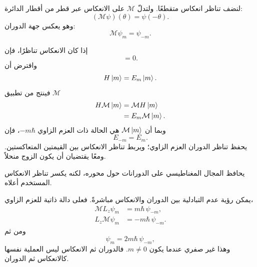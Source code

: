 لنضف تناظر انعكاس متقطعًا. ولتدلّ \(\mathcal M\) على الانعكاس عبر قطر من أقطار الدائرة:
\begin{equation}
(\mathcal M\psi)(\theta)=\psi(-\theta).
\end{equation}
وهو يعكس جهة الدوران:
\begin{equation}
\mathcal M\psi_m=\psi_{-m}.
\end{equation}

إذا كان الانعكاس تناظرًا، فإن
\begin{equation}
[\mathcal M,H]=0.
\end{equation}
وافترض أن
\begin{equation}
H\left\lvert m\right\rangle=E_m\left\lvert m\right\rangle.
\end{equation}
فينتج من تطبيق \(\mathcal M\)
\begin{align}
H\mathcal M\left\lvert m\right\rangle
&=\mathcal M H\left\lvert m\right\rangle\\
&=E_m\mathcal M\left\lvert m\right\rangle.
\end{align}
وبما أن \(\mathcal M\left\lvert m\right\rangle\) هي الحالة ذات العزم الزاوي \(-m\hbar\)، فإن
\begin{equation}
E_{-m}=E_m.
\end{equation}
يحفظ تناظر الدوران العزم الزاوي؛ ويربط تناظر الانعكاس بين القيمتين المتعاكستين. ومعًا يقتضيان أن يكون الزوج منحلاً.

\begin{classroomqa}
\end{classroomqa}

يحافظ المجال المغناطيسي على الدورانات حول محوره، لكنه يكسر تناظر الانعكاس المستخدم أعلاه.

\begin{classroomqa}
\end{classroomqa}

يمكن رؤية عدم التبادلية بين الدوران والانعكاس مباشرةً. فعلى دالة ذاتية للعزم الزاوي،
\begin{align}
\mathcal M L_z\psi_m
&=m\hbar\,\psi_{-m},\\
L_z\mathcal M\psi_m
&=-m\hbar\,\psi_{-m}.
\end{align}
ومن ثم
\begin{equation}
[\mathcal M,L_z]\psi_m
=2m\hbar\,\psi_{-m},
\end{equation}
وهذا غير صفري عندما يكون \(m\neq0\). فالدوران ثم الانعكاس ليس العملية نفسها كالانعكاس ثم الدوران.

